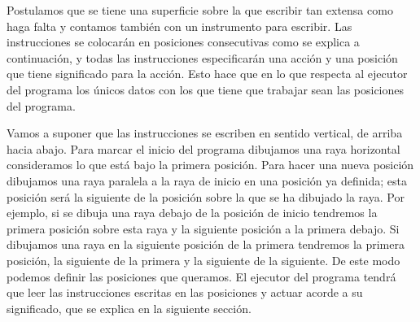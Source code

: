 Postulamos que se tiene una superficie sobre la que escribir tan extensa como haga falta y contamos
también con un instrumento para escribir. Las instrucciones se colocarán en posiciones consecutivas
como se explica a continuación, y todas las instrucciones especificarán una acción y una posición
que tiene significado para la acción. Esto hace que en lo que respecta al ejecutor del programa los
únicos datos con los que tiene que trabajar sean las posiciones del programa.

Vamos a suponer que las instrucciones se escriben en sentido vertical, de arriba hacia abajo. Para
marcar el inicio del programa dibujamos una raya horizontal consideramos lo que está bajo la primera
posición. Para hacer una nueva posición dibujamos una raya paralela a la raya de inicio en una
posición ya definida; esta posición será la siguiente de la posición sobre la que se ha dibujado la
raya. Por ejemplo, si se dibuja una raya debajo de la posición de inicio tendremos la primera
posición sobre esta raya y la siguiente posición a la primera debajo. Si dibujamos una raya en la
siguiente posición de la primera tendremos la primera posición, la siguiente de la primera y la
siguiente de la siguiente. De este modo podemos definir las posiciones que queramos. El ejecutor del
programa tendrá que leer las instrucciones escritas en las posiciones y actuar acorde a su
significado, que se explica en la siguiente sección.

